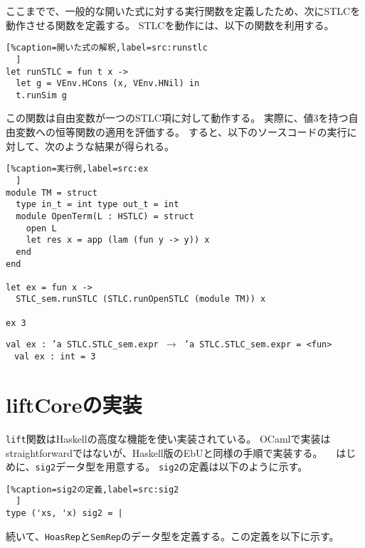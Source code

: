 \documentclass[uplatex]{sumiilab-paper}
\theoremstyle{mystyle}
\numberwithin{definition}{chapter} %
\begin{document}
ここまでで、一般的な開いた式に対する実行関数を定義したため、次にSTLCを動作させる関数を定義する。
STLCを動作には、以下の関数を利用する。

\begin{lstlisting}[%caption=開いた式の解釈,label=src:runstlc
  ]
let runSTLC = fun t x ->
  let g = VEnv.HCons (x, VEnv.HNil) in 
  t.runSim g
\end{lstlisting}

この関数は自由変数が一つのSTLC項に対して動作する。
実際に、値3を持つ自由変数への恒等関数の適用を評価する。
すると、以下のソースコードの実行に対して、次のような結果が得られる。

\begin{lstlisting}[%caption=実行例,label=src:ex
  ]
module TM = struct 
  type in_t = int type out_t = int
  module OpenTerm(L : HSTLC) = struct 
    open L 
    let res x = app (lam (fun y -> y)) x 
  end 
end

let ex = fun x -> 
  STLC_sem.runSTLC (STLC.runOpenSTLC (module TM)) x 

ex 3
\end{lstlisting}

{\tt val ex : 'a STLC.STLC\_sem.expr $\rightarrow$ 'a STLC.STLC\_sem.expr = <fun>\\　val ex : int = 3 }

\section{liftCoreの実装}
{\tt lift}関数はHaskellの高度な機能を使い実装されている。
OCamlで実装はstraightforwardではないが、Haskell版のEbUと同様の手順で実装する。
　はじめに、{\tt sig2}データ型を用意する。
{\tt sig2}の定義は以下のように示す。

\begin{lstlisting}[%caption=sig2の定義,label=src:sig2
  ]
type ('xs, 'x) sig2 = |
\end{lstlisting}

続いて、{\tt HoasRep}と{\tt SemRep}のデータ型を定義する。この定義を以下に示す。\\
\end{document}
